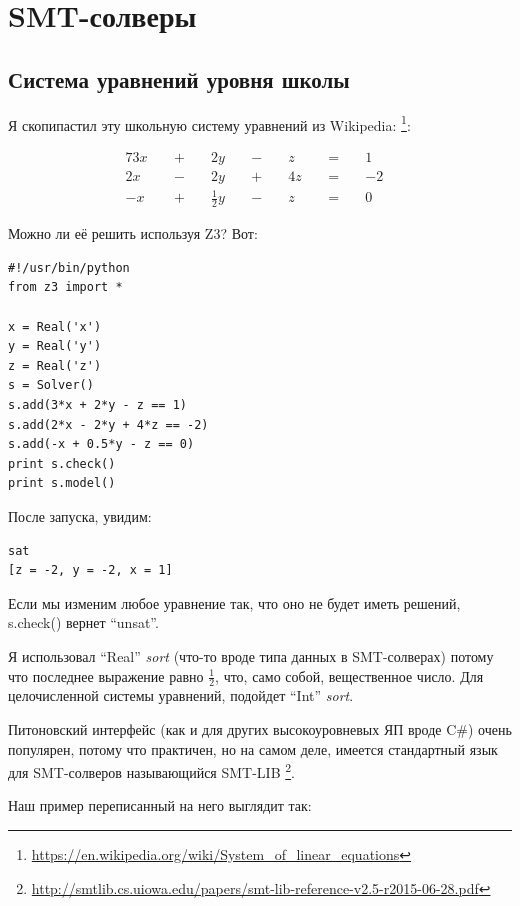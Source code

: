 \section{\ac{SMT}-солверы}

\subsection{Система уравнений уровня школы}

Я скопипастил эту школьную систему уравнений из Wikipedia:
\footnote{\url{https://en.wikipedia.org/wiki/System_of_linear_equations}}:

\begin{alignat*}{7}
3x &&\; + \;&& 2y             &&\; - \;&& z  &&\; = \;&& 1 & \\
2x &&\; - \;&& 2y             &&\; + \;&& 4z &&\; = \;&& -2 & \\
-x &&\; + \;&& \tfrac{1}{2} y &&\; - \;&& z  &&\; = \;&& 0 &
\end{alignat*}

Можно ли её решить используя Z3? Вот:

\begin{lstlisting}
#!/usr/bin/python
from z3 import *

x = Real('x')
y = Real('y')
z = Real('z')
s = Solver()
s.add(3*x + 2*y - z == 1)
s.add(2*x - 2*y + 4*z == -2)
s.add(-x + 0.5*y - z == 0)
print s.check()
print s.model()
\end{lstlisting}

После запуска, увидим:

\begin{lstlisting}
sat
[z = -2, y = -2, x = 1]
\end{lstlisting}

Если мы изменим любое уравнение так, что оно не будет иметь решений, s.check() вернет ``unsat''.

Я использовал ``Real'' \textit{sort} (что-то вроде типа данных в \ac{SMT}-солверах)
потому что последнее выражение равно $\frac{1}{2}$, что, само собой, вещественное число.
Для целочисленной системы уравнений, подойдет ``Int'' \textit{sort}.

Питоновский интерфейс (как и для других высокоуровневых ЯП вроде C\#) очень популярен, потому что практичен, но на самом
деле, имеется стандартный язык для SMT-солверов называющийся SMT-LIB
\footnote{\url{http://smtlib.cs.uiowa.edu/papers/smt-lib-reference-v2.5-r2015-06-28.pdf}}.

Наш пример переписанный на него выглядит так:

